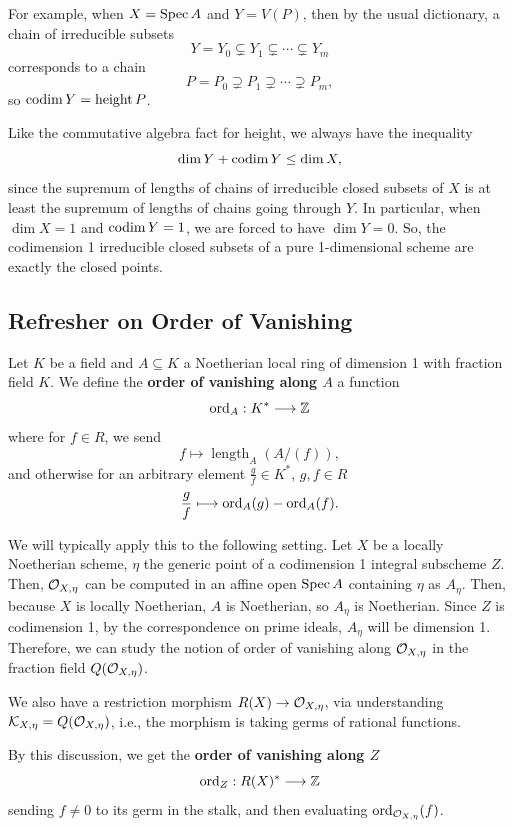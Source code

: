 \documentclass[12pt]{article}
\begin{document}
\begin{eg}
    For example, when $X=\operatorname{Spec} A$ and $Y=V(P)$, then by the usual dictionary, a chain of irreducible subsets
    \[Y=Y_0\subsetneq Y_1 \subsetneq \cdots \subsetneq Y_m\]
    corresponds to a chain
    \[P=P_0 \supsetneq P_1 \supsetneq \cdots \supsetneq P_m,\]
    so $\operatorname{codim} Y = \operatorname{height} P$.
\end{eg}

Like the commutative algebra fact for height, we always have the inequality
\[\dim Y + \operatorname{codim} Y \leq \dim X,\]
since the supremum of lengths of chains of irreducible closed subsets of $X$ is at least the supremum of lengths of chains going through $Y$. In particular, when $\dim X=1$ and $\operatorname{codim} Y = 1$, we are forced to have $\dim Y = 0$. So, the codimension 1 irreducible closed subsets of a pure 1-dimensional scheme are exactly the closed points.

\subsection{Refresher on Order of Vanishing}

\begin{defn}
    Let $K$ be a field and $A\subseteq K$ a Noetherian local ring of dimension 1 with fraction field $K$. We define the \textbf{order of vanishing along $A$} a function
    \[\operatorname{ord}_A: K^* \longrightarrow \mathbb{Z}\]
    where for $f\in R$, we send
    \[f \longmapsto \operatorname{length}_A(A/(f)),\]
    and otherwise for an arbitrary element $\frac{g}{f}\in K^*$, $g,f\in R$
    \[\frac{g}{f} \longmapsto \operatorname{ord}_A(g) - \operatorname{ord}_A(f).\]
\end{defn}

We will typically apply this to the following setting. Let $X$ be a locally Noetherian scheme, $\eta$ the generic point of a codimension 1 integral subscheme $Z$. Then, $\mathcal{O}_{X,\eta}$ can be computed in an affine open $\operatorname{Spec} A$ containing $\eta$ as $A_\eta$. Then, because $X$ is locally Noetherian, $A$ is Noetherian, so $A_\eta$ is Noetherian. Since $Z$ is codimension 1, by the correspondence on prime ideals, $A_\eta$ will be dimension 1. Therefore, we can study the notion of order of vanishing along $\mathcal{O}_{X,\eta}$ in the fraction field $Q(\mathcal{O}_{X,\eta})$.

We also have a restriction morphism $R(X)\to \mathcal{O}_{X,\eta}$, via understanding $\mathcal{K}_{X,\eta} = Q(\mathcal{O}_{X,\eta})$, i.e., the morphism is taking germs of rational functions.

\begin{defn}
    By this discussion, we get the \textbf{order of vanishing along $Z$}
    \[\operatorname{ord}_Z: R(X)^* \longrightarrow \mathbb{Z}\]
    sending $f\neq 0$ to its germ in the stalk, and then evaluating $\operatorname{ord}_{\mathcal{O}_{X,\eta}}(f)$.
\end{defn}
\end{document}
